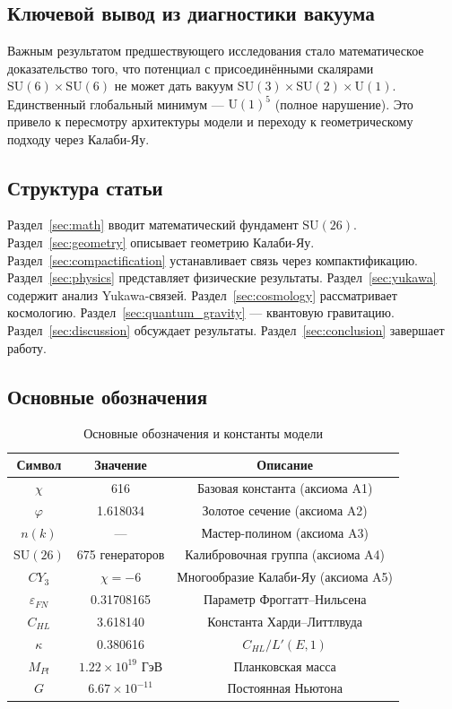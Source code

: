 \documentclass[12pt,a4paper,twoside]{article}
\newcommand{\SU}{\mathrm{SU}}
\newcommand{\Uone}{\mathrm{U}(1)}
\newcommand{\EPS}{\varepsilon}
\theoremstyle{definition}
\begin{document}
\subsection{Ключевой вывод из диагностики вакуума}

Важным результатом предшествующего исследования \cite{Matershov:2026f} стало математическое доказательство того, что потенциал с присоединёнными скалярами $\SU(6) \times \SU(6)$ не может дать вакуум $\SU(3) \times \SU(2) \times \Uone$. Единственный глобальный минимум — $\Uone^5$ (полное нарушение). Это привело к пересмотру архитектуры модели и переходу к геометрическому подходу через Калаби-Яу.

\subsection{Структура статьи}

Раздел~\ref{sec:math} вводит математический фундамент $\SU(26)$. Раздел~\ref{sec:geometry} описывает геометрию Калаби-Яу. Раздел~\ref{sec:compactification} устанавливает связь через компактификацию. Раздел~\ref{sec:physics} представляет физические результаты. Раздел~\ref{sec:yukawa} содержит анализ Yukawa-связей. Раздел~\ref{sec:cosmology} рассматривает космологию. Раздел~\ref{sec:quantum_gravity} — квантовую гравитацию. Раздел~\ref{sec:discussion} обсуждает результаты. Раздел~\ref{sec:conclusion} завершает работу.

\subsection{Основные обозначения}

\begin{table}[H]
\centering
\small
\caption{Основные обозначения и константы модели}
\label{tab:notations}
\begin{tabular}{c|c|c}
\toprule
\textbf{Символ} & \textbf{Значение} & \textbf{Описание} \\
\midrule
$\chi$ & 616 & Базовая константа (аксиома A1) \\
$\varphi$ & 1.618034 & Золотое сечение (аксиома A2) \\
$n(k)$ & — & Мастер-полином (аксиома A3) \\
$\SU(26)$ & 675 генераторов & Калибровочная группа (аксиома A4) \\
$CY_3$ & $\chi = -6$ & Многообразие Калаби-Яу (аксиома A5) \\
$\EPS_{FN}$ & 0.31708165 & Параметр Фроггатт--Нильсена \\
$C_{HL}$ & 3.618140 & Константа Харди--Литтлвуда \\
$\kappa$ & 0.380616 & $C_{HL} / L'(E,1)$ \\
$M_{Pl}$ & $1.22 \times 10^{19}$ ГэВ & Планковская масса \\
$G$ & $6.67 \times 10^{-11}$ & Постоянная Ньютона \\
\bottomrule
\end{tabular}
\end{table}
\end{document}
